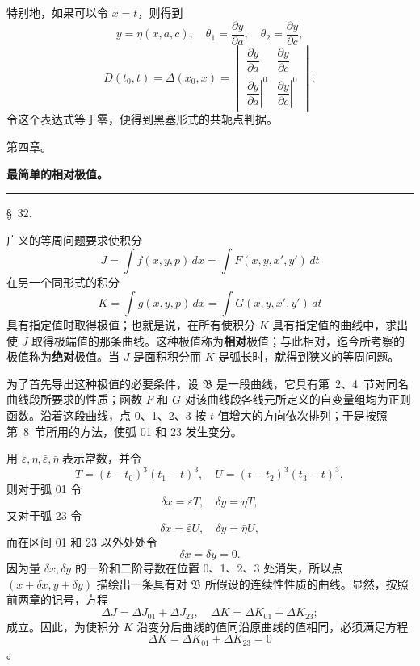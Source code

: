 \documentclass[11pt,a4paper,leqno]{article}
\begin{document}
特别地，如果可以令 $x=t$，则得到
\[
y=\eta(x,a,c),
\quad
\theta_1=\frac{\partial y}{\partial a},
\quad
\theta_2=\frac{\partial y}{\partial c},
\]
\[
D(t_0,t)=\Delta(x_0,x)=
\begin{vmatrix}
\dfrac{\partial y}{\partial a}&\dfrac{\partial y}{\partial c}\\[1.2ex]
\left.\dfrac{\partial y}{\partial a}\right|^0&
\left.\dfrac{\partial y}{\partial c}\right|^0
\end{vmatrix};
\]
令这个表达式等于零，便得到黑塞形式的共轭点判据。
\begin{center}
{\large 第四章。}\par
\vspace{4mm}
{\Large\bfseries 最简单的相对极值。}\par
\vspace{2mm}\rule{26mm}{0.4pt}\par
\end{center}

\begin{center}{\large \S~32.}\end{center}

广义的等周问题要求使积分
\[
J=\int f(x,y,p)\,dx=\int F(x,y,x',y')\,dt
\]
在另一个同形式的积分
\[
K=\int g(x,y,p)\,dx=\int G(x,y,x',y')\,dt
\]
具有指定值时取得极值；也就是说，在所有使积分 $K$ 具有指定值的曲线中，求出使 $J$ 取得极端值的那条曲线。这种极值称为\textbf{相对}极值；与此相对，迄今所考察的极值称为\textbf{绝对}极值。当 $J$ 是面积积分而 $K$ 是弧长时，就得到狭义的等周问题。

为了首先导出这种极值的必要条件，设 $\mathfrak{B}$ 是一段曲线，它具有第~2、4~节对同名曲线段所要求的性质；函数 $F$ 和 $G$ 对该曲线段各线元所定义的自变量组均为正则函数。沿着这段曲线，点 0、1、2、3 按 $t$ 值增大的方向依次排列；于是按照第~8~节所用的方法，使弧 01 和 23 发生变分。

用 $\varepsilon,\eta,\bar\varepsilon,\bar\eta$ 表示常数，并令
\[
T=(t-t_0)^3(t_1-t)^3,
\quad
U=(t-t_2)^3(t_3-t)^3,
\]
则对于弧 01 令
\[
\delta x=\varepsilon T,
\quad
\delta y=\eta T,
\]
又对于弧 23 令
\[
\delta x=\bar\varepsilon U,
\quad
\delta y=\bar\eta U,
\]
而在区间 01 和 23 以外处处令
\[
\delta x=\delta y=0.
\]
因为量 $\delta x,\delta y$ 的一阶和二阶导数在位置 0、1、2、3 处消失，所以点 $(x+\delta x,y+\delta y)$ 描绘出一条具有对 $\mathfrak{B}$ 所假设的连续性性质的曲线。显然，按照前两章的记号，方程
\begin{equation}\tag{1}
\Delta J=\Delta J_{01}+\Delta J_{23},
\quad
\Delta K=\Delta K_{01}+\Delta K_{23};
\end{equation}
成立。因此，为使积分 $K$ 沿变分后曲线的值同沿原曲线的值相同，必须满足方程
\[
\Delta K=\Delta K_{01}+\Delta K_{23}=0
\]
。
\end{document}
